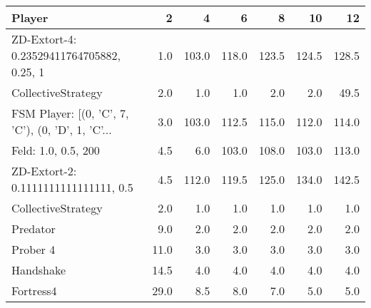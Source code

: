 \begin{tabular}{lrrrrrr}
\toprule
                                            Player &     2 &      4 &      6 &      8 &     10 &     12 \\
\midrule
         ZD-Extort-4: 0.23529411764705882, 0.25, 1 &   1.0 &  103.0 &  118.0 &  123.5 &  124.5 &  128.5 \\
                                CollectiveStrategy &   2.0 &    1.0 &    1.0 &    2.0 &    2.0 &   49.5 \\
 FSM Player: [(0, 'C', 7, 'C'), (0, 'D', 1, 'C'... &   3.0 &  103.0 &  112.5 &  115.0 &  112.0 &  114.0 \\
                               Feld: 1.0, 0.5, 200 &   4.5 &    6.0 &  103.0 &  108.0 &  103.0 &  113.0 \\
              ZD-Extort-2: 0.1111111111111111, 0.5 &   4.5 &  112.0 &  119.5 &  125.0 &  134.0 &  142.5 \\
                                CollectiveStrategy &   2.0 &    1.0 &    1.0 &    1.0 &    1.0 &    1.0 \\
                                          Predator &   9.0 &    2.0 &    2.0 &    2.0 &    2.0 &    2.0 \\
                                          Prober 4 &  11.0 &    3.0 &    3.0 &    3.0 &    3.0 &    3.0 \\
                                         Handshake &  14.5 &    4.0 &    4.0 &    4.0 &    4.0 &    4.0 \\
                                         Fortress4 &  29.0 &    8.5 &    8.0 &    7.0 &    5.0 &    5.0 \\
\bottomrule
\end{tabular}
